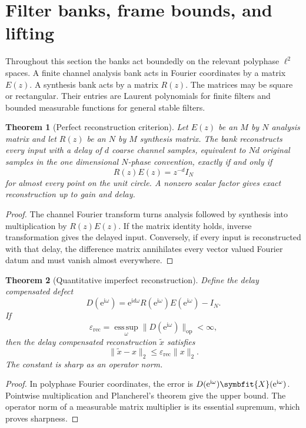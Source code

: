 \documentclass[11pt,letterpaper]{article}
\newtheorem{theorem}{Theorem}[section]
\theoremstyle{plain}
\theoremstyle{plain}
\theoremstyle{plain}
\theoremstyle{definition}
\theoremstyle{definition}
\theoremstyle{definition}
\theoremstyle{definition}
\theoremstyle{remark}
\theoremstyle{remark}
\theoremstyle{remark}
\theoremstyle{remark}
\newcommand{\ii}{\mathrm i}
\newcommand{\esssup}{\operatorname*{ess\,sup}}
\newcommand{\e}{\mathrm e}
\providecommand{\bm}[1]{\symbfit{#1}}
\begin{document}
\section{Filter banks, frame bounds, and lifting}\label{extension:section:05}\label{sec:filter_banks}

Throughout this section the banks act boundedly on the relevant polyphase \(\ell^2\) spaces. A finite channel analysis bank acts in Fourier coordinates by a matrix \(E(z)\). A synthesis bank acts by a matrix \(R(z)\). The matrices may be square or rectangular. Their entries are Laurent polynomials for finite filters and bounded measurable functions for general stable filters.

\begin{theorem}[Perfect reconstruction criterion]\label{thm:perfect_reconstruction}
Let \(E(z)\) be an \(M\) by \(N\) analysis matrix and let \(R(z)\) be an \(N\) by \(M\) synthesis matrix. The bank reconstructs every input with a delay of \(d\) coarse channel samples, equivalent to \(Nd\) original samples in the one dimensional \(N\)-phase convention, exactly if and only if
\[
R(z)E(z)=z^{-d}I_N
\]
for almost every point on the unit circle. A nonzero scalar factor gives exact reconstruction up to gain and delay.
\end{theorem}

\begin{proof}
The channel Fourier transform turns analysis followed by synthesis into multiplication by \(R(z)E(z)\). If the matrix identity holds, inverse transformation gives the delayed input. Conversely, if every input is reconstructed with that delay, the difference matrix annihilates every vector valued Fourier datum and must vanish almost everywhere.
\end{proof}

\begin{theorem}[Quantitative imperfect reconstruction]\label{thm:imperfect_reconstruction}
Define the delay compensated defect
\[
D(\e^{\ii\omega})
=
\e^{\ii d\omega}R(\e^{\ii\omega})E(\e^{\ii\omega})-I_N.
\]
If
\[
\varepsilon_{\mathrm{rec}}
=
\esssup_{\omega}\|D(\e^{\ii\omega})\|_{\mathrm{op}}<\infty,
\]
then the delay compensated reconstruction \(\widetilde x\) satisfies
\[
\|\widetilde x-x\|_2
\leq
\varepsilon_{\mathrm{rec}}\|x\|_2.
\]
The constant is sharp as an operator norm.
\end{theorem}

\begin{proof}
In polyphase Fourier coordinates, the error is \(D(\e^{\ii\omega})\bm X(\e^{\ii\omega})\). Pointwise multiplication and Plancherel's theorem give the upper bound. The operator norm of a measurable matrix multiplier is its essential supremum, which proves sharpness.
\end{proof}
\end{document}

